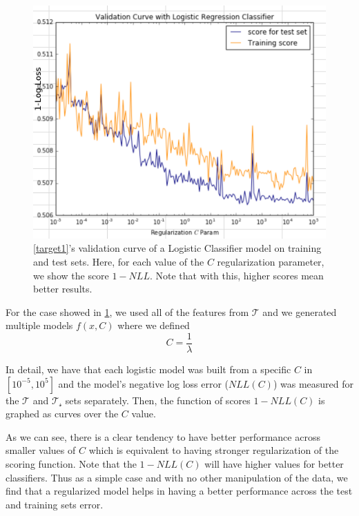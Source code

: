 \begin{figure}[h!]
\begin{center}
\includegraphics[width=0.9\columnwidth]{figures/regularization/figure-log_loss_error_validation_curve.png}
\caption{ \cref{target1}'s validation curve of a Logistic Classifier model on training and test sets. Here, for each value of the $C$ regularization parameter, we show the score $1 - NLL$. Note that with this, higher scores mean better results.}
\label{fig:log_loss_regularization_validation_curve}
\end{center}
\end{figure}

For the case  showed in \cref{fig:log_loss_regularization_validation_curve}, we used all of the features from $\mathcal{T}$ and we generated multiple models $f(x,C)$ where we defined
$$C = \frac{1}{\lambda} $$

In detail, we have that each logistic model was built from a specific $C$ in  $[10^{-5},10^5]$  and the model's negative log loss error ($NLL(C)$) was measured for the $\mathcal{T}$ and $\mathcal{T_s}$ sets separately.
Then, the function of scores $1-NLL(C)$ is graphed as curves over the $C$ value.

As we can see, there is a clear tendency to have better performance across smaller values of $C$ which is equivalent to having stronger regularization of the scoring function.
Note that the $1-NLL(C)$ will have higher values for better classifiers.
Thus as a simple case and with no other manipulation of the data, we find that a regularized model helps in having a better performance across the test and training sets error.


